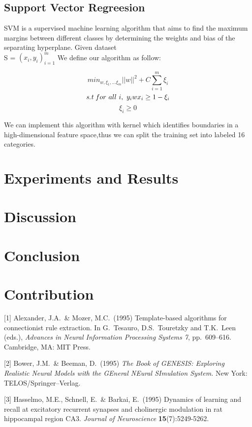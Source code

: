 \documentclass{article}
\begin{document}
\subsection{Support Vector Regreesion}

SVM is a supervised machine learning algorithm that aims to find the maximum margins between different classes by determining the weights and bias of the separating hyperplane. Given dataset \\S = ${(x_i,y_i)}_{i=1}^m $ We define our algorithm as follow:

$$ min_{w,\xi_1,...\xi_m}||w||^2 + C\sum_{i=1}^m \xi_i $$
$$ \emph{s.t} \ for \ all \ i, \ y_i w x_i \ge 1 - \xi_i $$
$$ \xi_i \ge 0 $$  


We can implement this algorithm with kernel which identifies boundaries in a high-dimensional feature space,thus  we can split the training set into labeled 16 categories.
\section{Experiments and Results}

\section{Discussion}

\section{Conclusion}


\section{Contribution}

\small

[1] Alexander, J.A.\ \& Mozer, M.C.\ (1995) Template-based algorithms for
connectionist rule extraction. In G.\ Tesauro, D.S.\ Touretzky and T.K.\ Leen
(eds.), {\it Advances in Neural Information Processing Systems 7},
pp.\ 609--616. Cambridge, MA: MIT Press.

[2] Bower, J.M.\ \& Beeman, D.\ (1995) {\it The Book of GENESIS: Exploring
  Realistic Neural Models with the GEneral NEural SImulation System.}  New York:
TELOS/Springer--Verlag.

[3] Hasselmo, M.E., Schnell, E.\ \& Barkai, E.\ (1995) Dynamics of learning and
recall at excitatory recurrent synapses and cholinergic modulation in rat
hippocampal region CA3. {\it Journal of Neuroscience} {\bf 15}(7):5249-5262.
\end{document}
